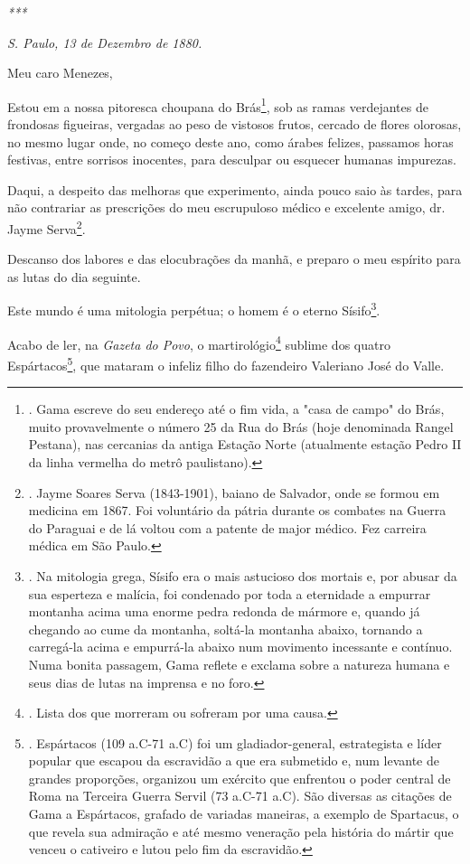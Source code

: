 \emph{***}

\emph{S. Paulo, 13 de Dezembro de 1880. }

Meu caro Menezes,

Estou em a nossa pitoresca choupana do Brás\footnote{. Gama escreve do
  seu endereço até o fim vida, a "casa de campo" do Brás, muito
  provavelmente o número 25 da Rua do Brás (hoje denominada Rangel
  Pestana), nas cercanias da antiga Estação Norte (atualmente estação
  Pedro II da linha vermelha do metrô paulistano).}, sob as ramas
verdejantes de frondosas figueiras, vergadas ao peso de vistosos frutos,
cercado de flores olorosas, no mesmo lugar onde, no começo deste ano,
como árabes felizes, passamos horas festivas, entre sorrisos inocentes,
para desculpar ou esquecer humanas impurezas.

Daqui, a despeito das melhoras que experimento, ainda pouco saio às
tardes, para não contrariar as prescrições do meu escrupuloso médico e
excelente amigo, dr. Jayme Serva\footnote{. Jayme Soares Serva
  (1843-1901), baiano de Salvador, onde se formou em medicina em 1867.
  Foi voluntário da pátria durante os combates na Guerra do Paraguai e
  de lá voltou com a patente de major médico. Fez carreira médica em São
  Paulo.}.

Descanso dos labores e das elocubrações da manhã, e preparo o meu
espírito para as lutas do dia seguinte.

Este mundo é uma mitologia perpétua; o homem é o eterno Sísifo\footnote{.
  Na mitologia grega, Sísifo era o mais astucioso dos mortais e, por
  abusar da sua esperteza e malícia, foi condenado por toda a eternidade
  a empurrar montanha acima uma enorme pedra redonda de mármore e,
  quando já chegando ao cume da montanha, soltá-la montanha abaixo,
  tornando a carregá-la acima e empurrá-la abaixo num movimento
  incessante e contínuo. Numa bonita passagem, Gama reflete e exclama
  sobre a natureza humana e seus dias de lutas na imprensa e no foro.}.

Acabo de ler, na \emph{Gazeta do Povo}, o martirológio\footnote{. Lista
  dos que morreram ou sofreram por uma causa.} sublime dos quatro
Espártacos\footnote{. Espártacos (109 a.C-71 a.C) foi um
  gladiador-general, estrategista e líder popular que escapou da
  escravidão a que era submetido e, num levante de grandes proporções,
  organizou um exército que enfrentou o poder central de Roma na
  Terceira Guerra Servil (73 a.C-71 a.C). São diversas as citações de
  Gama a Espártacos, grafado de variadas maneiras, a exemplo de
  Spartacus, o que revela sua admiração e até mesmo veneração pela
  história do mártir que venceu o cativeiro e lutou pelo fim da
  escravidão.}, que mataram o infeliz filho do fazendeiro Valeriano José
do Valle.

